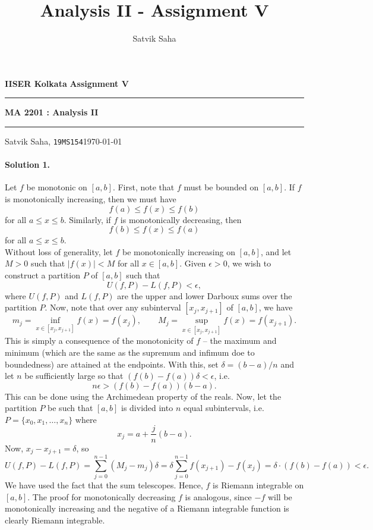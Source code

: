 \documentclass[10pt]{article}
\title{Analysis II - Assignment V}
\author{Satvik Saha}
\date{}
\begin{document}
    \par\textbf{IISER Kolkata} \hfill \textbf{Assignment V}
    \vspace{3pt}
    \hrule
    \vspace{3pt}
    \begin{center}
            \LARGE{\textbf{MA 2201 : Analysis II}}
    \end{center}
    \vspace{3pt}
    \hrule
    \vspace{3pt}
    Satvik Saha, \texttt{19MS154}\hfill\today
    \vspace{20pt}
    
    \paragraph{Solution 1.}
    Let $f$ be monotonic on $[a, b]$. First, note that $f$ must be bounded on $[a,
    b]$. If $f$ is monotonically increasing, then we must have \[
        f(a) \leq f(x) \leq f(b)
    \] for all $a \leq x \leq b$. Similarly, if $f$ is monotonically decreasing,
    then \[
        f(b) \leq f(x) \leq f(a)
    \] for all $a \leq x \leq b$. \\

    Without loss of generality, let $f$ be monotonically increasing on $[a, b]$, and
    let $M > 0$ such that $|f(x)| < M$ for all $x \in [a, b]$. Given $\epsilon > 0$,
    we wish to construct a partition $P$ of $[a, b]$ such that \[
        U(f, P) - L(f, P) < \epsilon,
    \] where $U(f, P)$ and $L(f, P)$ are the upper and lower Darboux sums over the
    partition $P$. Now, note that over any subinterval $[x_j, x_{j + 1}]$ of $[a,
    b]$, we have \[
        m_j = \inf_{x \in [x_j, x_{j + 1}]} f(x) = f(x_j), \qquad
        M_j = \sup_{x \in [x_j, x_{j + 1}]} f(x) = f(x_{j + 1}).
    \] This is simply a consequence of the monotonicity of $f$ -- the maximum and
    minimum (which are the same as the supremum and infimum doe to boundedness) are
    attained at the endpoints. With this, set $\delta = (b - a) / n$ and let $n$ be
    sufficiently large so that $(f(b) - f(a))\delta < \epsilon$, i.e.\ \[
        n\epsilon > (f(b) - f(a))(b - a).
    \] This can be done using the Archimedean property of the reals. Now, let the
    partition $P$ be such that $[a, b]$ is divided into $n$ equal subintervals,
    i.e.\ $P = \{x_0, x_1, \dots, x_n\}$ where \[
        x_j = a + \frac{j}{n}(b - a).
    \] Now, $x_{j} - x_{j + 1} = \delta$, so \[
        U(f, P) - L(f, P) = \sum_{j = 0}^{n - 1} (M_j - m_j)\delta = \delta \sum_{j
        = 0}^{n - 1} f(x_{j + 1}) - f(x_j) = \delta \cdot (f(b) - f(a)) < \epsilon.
    \] We have used the fact that the sum telescopes. Hence, $f$ is Riemann
    integrable on $[a, b]$. The proof for monotonically decreasing $f$ is analogous,
    since $-f$ will be monotonically increasing and the negative of a Riemann
    integrable function is clearly Riemann integrable.
\end{document}
